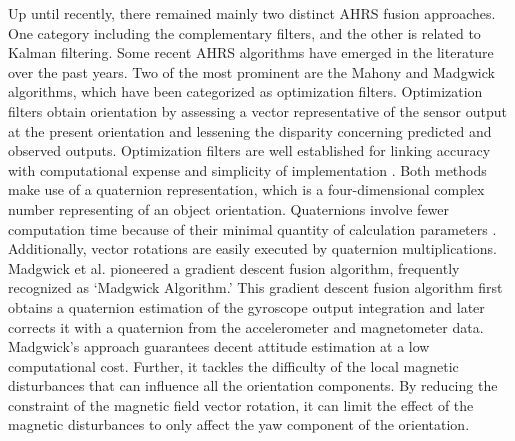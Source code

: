 Up until recently, there remained mainly two distinct AHRS fusion approaches. One category including the complementary filters, and the other is related to Kalman filtering. Some recent AHRS algorithms have emerged in the literature over the past years. Two of the most prominent are the Mahony and Madgwick algorithms, which have been categorized as optimization filters. Optimization filters obtain orientation by assessing a vector representative of the sensor output at the present orientation and lessening the disparity concerning predicted and observed outputs. Optimization filters are well established for linking accuracy with computational expense and simplicity of implementation \cite{madgwick2020extended}.
Both methods make use of a quaternion representation, which is a four-dimensional complex number representing of an object orientation. Quaternions involve fewer computation time because of their minimal quantity of calculation parameters \cite{ludwig2018comparison}. Additionally, vector rotations are easily executed by quaternion multiplications.
Madgwick et al. \cite{madgwick2010efficient} pioneered a gradient descent fusion algorithm, frequently recognized as ‘Madgwick Algorithm.’ This gradient descent fusion algorithm first obtains a quaternion estimation of the gyroscope output integration and later corrects it with a quaternion from the accelerometer and magnetometer data. Madgwick’s approach guarantees decent attitude estimation at a low computational cost. Further, it tackles the difficulty of the local magnetic disturbances that can influence all the orientation components. By reducing the constraint of the magnetic field vector rotation, it can limit the effect of the magnetic disturbances to only affect the yaw component of the orientation.

